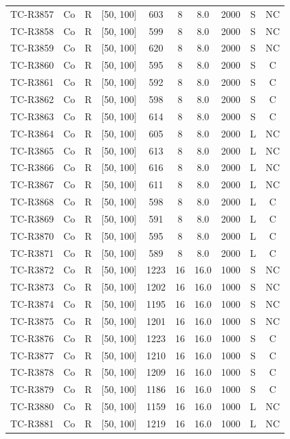 \begin{longtable}{lccccccccc}
TC-R3857 & Co & R & [50, 100] & 603 & 8 & 8.0 & 2000 & S & NC \\
TC-R3858 & Co & R & [50, 100] & 599 & 8 & 8.0 & 2000 & S & NC \\
TC-R3859 & Co & R & [50, 100] & 620 & 8 & 8.0 & 2000 & S & NC \\
TC-R3860 & Co & R & [50, 100] & 595 & 8 & 8.0 & 2000 & S & C \\
TC-R3861 & Co & R & [50, 100] & 592 & 8 & 8.0 & 2000 & S & C \\
TC-R3862 & Co & R & [50, 100] & 598 & 8 & 8.0 & 2000 & S & C \\
TC-R3863 & Co & R & [50, 100] & 614 & 8 & 8.0 & 2000 & S & C \\
TC-R3864 & Co & R & [50, 100] & 605 & 8 & 8.0 & 2000 & L & NC \\
TC-R3865 & Co & R & [50, 100] & 613 & 8 & 8.0 & 2000 & L & NC \\
TC-R3866 & Co & R & [50, 100] & 616 & 8 & 8.0 & 2000 & L & NC \\
TC-R3867 & Co & R & [50, 100] & 611 & 8 & 8.0 & 2000 & L & NC \\
TC-R3868 & Co & R & [50, 100] & 598 & 8 & 8.0 & 2000 & L & C \\
TC-R3869 & Co & R & [50, 100] & 591 & 8 & 8.0 & 2000 & L & C \\
TC-R3870 & Co & R & [50, 100] & 595 & 8 & 8.0 & 2000 & L & C \\
TC-R3871 & Co & R & [50, 100] & 589 & 8 & 8.0 & 2000 & L & C \\
TC-R3872 & Co & R & [50, 100] & 1223 & 16 & 16.0 & 1000 & S & NC \\
TC-R3873 & Co & R & [50, 100] & 1202 & 16 & 16.0 & 1000 & S & NC \\
TC-R3874 & Co & R & [50, 100] & 1195 & 16 & 16.0 & 1000 & S & NC \\
TC-R3875 & Co & R & [50, 100] & 1201 & 16 & 16.0 & 1000 & S & NC \\
TC-R3876 & Co & R & [50, 100] & 1223 & 16 & 16.0 & 1000 & S & C \\
TC-R3877 & Co & R & [50, 100] & 1210 & 16 & 16.0 & 1000 & S & C \\
TC-R3878 & Co & R & [50, 100] & 1209 & 16 & 16.0 & 1000 & S & C \\
TC-R3879 & Co & R & [50, 100] & 1186 & 16 & 16.0 & 1000 & S & C \\
TC-R3880 & Co & R & [50, 100] & 1159 & 16 & 16.0 & 1000 & L & NC \\
TC-R3881 & Co & R & [50, 100] & 1219 & 16 & 16.0 & 1000 & L & NC \\

\end{longtable}
